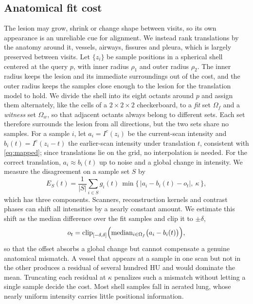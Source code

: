 \subsection{Anatomical fit cost}
\label{sec:fit}
The lesion may grow, shrink or change shape between visits, so its own appearance is an unreliable cue for alignment.
We instead rank translations by the anatomy around it, \ie vessels, airways, fissures and pleura, which is largely preserved between visits. Let $\{z_i\}$ be sample positions in a spherical shell centered at the query $p$, with inner radius $\rho_1$ and outer radius $\rho_2$.
The inner radius keeps the lesion and its immediate surroundings out of the cost, and the outer radius keeps the samples close enough to the lesion for the translation model to hold.
We divide the shell into its eight octants around $p$ and assign them alternately, like the cells of a $2\times2\times2$ checkerboard, to a \emph{fit} set $\Omega_f$ and a \emph{witness} set $\Omega_w$, so that adjacent octants always belong to different sets.
Each set therefore surrounds the lesion from all directions, but the two sets share no samples. For a sample $i$, let $a_i = I^{c}(z_i)$ be the current-scan intensity and $b_i(t) = I^{e}(z_i - t)$ the earlier-scan intensity under translation $t$, consistent with \cref{eq:mapped}; since translations lie on the grid, no interpolation is needed.
For the correct translation, $a_i \approx b_i(t)$ up to noise and a global change in intensity.
We measure the disagreement on a sample set $S$ by
\begin{equation}
E_S(t) = \frac{1}{|S|}\sum_{i \in S} g_i(t)\,\min\bigl\{\,|a_i - b_i(t) - o_t|,\ \kappa\,\bigr\},
\label{eq:residual}
\end{equation}
which has three components. Scanners, reconstruction kernels and contrast phases can shift all intensities by a nearly constant amount.
We estimate this shift as the median difference over the fit samples and clip it to $\pm\delta$,
\begin{equation}
o_t = \mathrm{clip}_{[-\delta,\delta]}\Bigl(\mathrm{median}_{i\in\Omega_f}\bigl(a_i - b_i(t)\bigr)\Bigr),
\end{equation}
so that the offset absorbs a global change but cannot compensate a genuine anatomical mismatch. A vessel that appears at a sample in one scan but not in the other produces a residual of several hundred HU and would dominate the mean.
Truncating each residual at $\kappa$ penalizes such a mismatch without letting a single sample decide the cost. Most shell samples fall in aerated lung, whose nearly uniform intensity carries little positional information.
